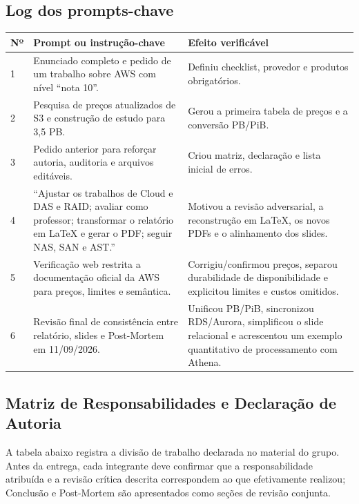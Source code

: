 \documentclass[11pt,a4paper]{article}
\begin{document}
\subsection{Log dos prompts-chave}
\begin{longtable}{@{}p{.7cm}p{7.3cm}p{6.4cm}@{}}\toprule
\textbf{Nº} & \textbf{Prompt ou instrução-chave} & \textbf{Efeito verificável}\\\midrule\endhead
1 & Enunciado completo e pedido de um trabalho sobre AWS com nível ``nota 10''. & Definiu checklist, provedor e produtos obrigatórios.\\
2 & Pesquisa de preços atualizados de S3 e construção de estudo para 3,5 PB. & Gerou a primeira tabela de preços e a conversão PB/PiB.\\
3 & Pedido anterior para reforçar autoria, auditoria e arquivos editáveis. & Criou matriz, declaração e lista inicial de erros.\\
4 & ``Ajustar os trabalhos de Cloud e DAS e RAID; avaliar como professor; transformar o relatório em LaTeX e gerar o PDF; seguir NAS, SAN e AST.'' & Motivou a revisão adversarial, a reconstrução em LaTeX, os novos PDFs e o alinhamento dos slides.\\
5 & Verificação web restrita a documentação oficial da AWS para preços, limites e semântica. & Corrigiu/confirmou preços, separou durabilidade de disponibilidade e explicitou limites e custos omitidos.\\
6 & Revisão final de consistência entre relatório, slides e Post-Mortem em 11/09/2026. & Unificou PB/PiB, sincronizou RDS/Aurora, simplificou o slide relacional e acrescentou um exemplo quantitativo de processamento com Athena.\\\bottomrule
\end{longtable}

\subsection{Matriz de Responsabilidades e Declaração de Autoria}
A tabela abaixo registra a divisão de trabalho declarada no material do grupo. Antes da entrega, cada integrante deve confirmar que a responsabilidade atribuída e a revisão crítica descrita correspondem ao que efetivamente realizou; Conclusão e Post-Mortem são apresentados como seções de revisão conjunta.
\end{document}
